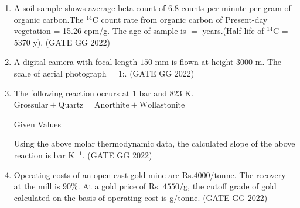\documentclass[journal]{IEEEtran}
\begin{document}
\begin{enumerate}[start=1]
\item A soil sample shows average beta count of $6.8$ counts per minute  per gram of organic carbon.The $^{14}$C count rate from organic carbon of  Present-day vegetation = 15.26 cpm/g.  The age of sample is $=$  \makebox[2cm]{\hrulefill}years.(Half-life of $^{14}$C = $5370$ y). 
\hfill(GATE GG 2022)
\vspace{0.5cm}

\item A digital camera with focal length $150$ mm is flown at height $3000$ m.  
The scale of aerial photograph = 1:\makebox[2cm]{\hrulefill}.
\hfill(GATE GG 2022)
\vspace{0.5cm}


\item The following reaction occurs at 1 bar and 823 K. \\ 
$\text{Grossular} + \text{Quartz}   = \text{Anorthite} + \text{Wollastonite}$
\begin{table}[h]
    \centering
    
    \caption{Given Values}
    \label{tab:1}
\end{table}
Using the above molar thermodynamic data, the calculated slope of the above 
reaction is \makebox[2cm]{\hrulefill} bar K$^{-1}$. 
\hfill(GATE GG 2022)
\vspace{0.5cm}

\item Operating costs of an open cast gold mine are Rs.$4000$/tonne.  The recovery at the mill is $90$\%. At a gold price of Rs. $4550$/g, the cutoff grade of gold calculated on the basis of operating cost is \makebox[2cm]{\hrulefill}g/tonne. 
\hfill(GATE GG 2022)
\end{enumerate}
\end{document}
